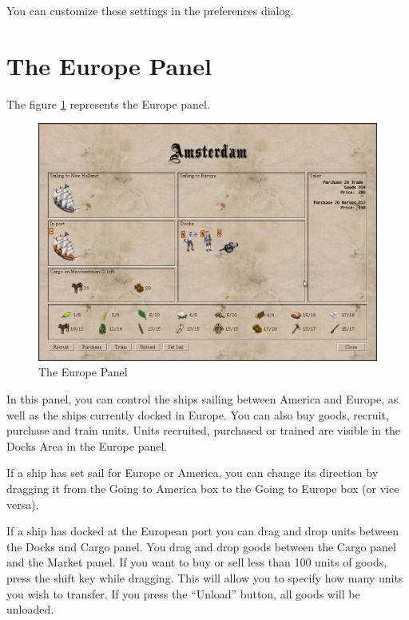 \documentclass[12pt]{book}
\begin{document}
You can customize these settings in the preferences dialog.


\hypertarget{europe panel}{\section{The Europe Panel}}

The figure \ref{europe_panel_fig} represents the Europe panel.
\begin{figure}[htb]
  \begin{center}
    \includegraphics[scale=0.35]{images/europe_panel.png}
    \caption{The Europe Panel\label{europe_panel_fig}}
  \end{center}
\end{figure}

In this panel, you can control the ships sailing between America and
Europe, as well as the ships currently docked in Europe. You can also
buy goods, recruit, purchase and train units. Units recruited,
purchased or trained are visible in the Docks Area in the Europe
panel.

If a ship has set sail for Europe or America, you can change its
direction by dragging it from the Going to America box to the Going
to Europe box (or vice versa).

If a ship has docked at the European port you can drag and drop units
between the Docks and Cargo panel. You drag and drop goods between the
Cargo panel and the Market panel. If you want to buy or sell less than
100 units of goods, press the shift key while dragging. This will
allow you to specify how many units you wish to transfer. If you press
the ``Unload'' button, all goods will be unloaded.
\end{document}
